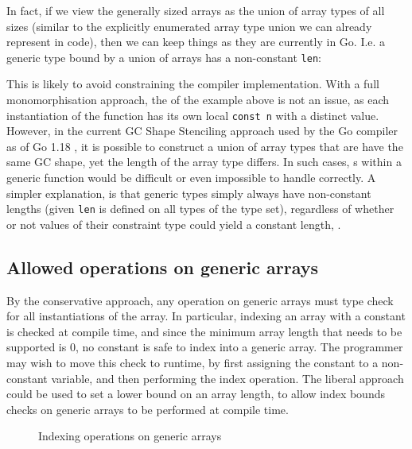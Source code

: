 
In fact, if we view the generally sized arrays as the union of array types of
all sizes (similar to the explicitly enumerated array type union we can already
represent in code), then we can keep things as they are currently in Go. I.e. a
generic type bound by a union of arrays has a non-constant \texttt{len}:


This is likely to avoid constraining the compiler implementation. With a full
monomorphisation approach, the  of the example above is not an issue,
as each instantiation of the function has its own local \texttt{const n} with a
distinct value. However, in the current GC Shape Stenciling approach used by the
Go compiler as of Go 1.18 \autocite{generics1.18}, it is possible to construct a
union of array types that are have the same GC shape, yet the length of the
array type differs. In such cases, s within a generic function would
be difficult or even impossible to handle correctly. A simpler explanation, is
that generic types simply always have non-constant lengths (given \texttt{len}
is defined on all types of the type set), regardless of whether or not values of
their constraint type could yield a constant length, \autocite{spec}.

\subsection{Allowed operations on generic arrays}

By the conservative approach, any operation on generic arrays must type check
for all instantiations of the array. In particular, indexing an array with a
constant is checked at compile time, and since the minimum array length that
needs to be supported is 0, no constant is safe to index into a generic array.
The programmer may wish to move this check to runtime, by first assigning the
constant to a non-constant  variable, and then performing the index
operation. The liberal approach could be used to set a lower bound on an array
length, to allow index bounds checks on generic arrays to be performed at
compile time.

\begin{figure}
    \caption{Indexing operations on generic arrays}
\end{figure}


